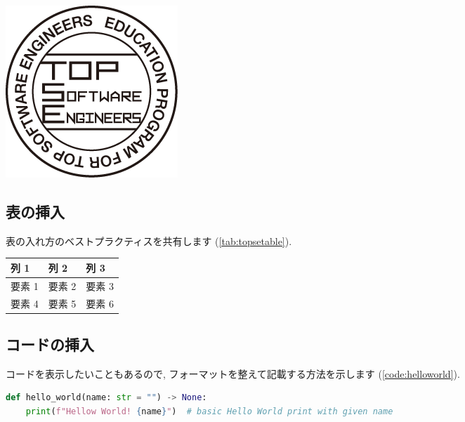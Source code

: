\documentclass[a4paper,9pt]{extarticle}
\begin{document}
\begin{multicols}{2}
\begin{center}
\begin{minipage}{\linewidth}
\centering
\includegraphics[width=0.5\linewidth]{image.png}
\label{fig:topselogo}
\end{minipage}
\end{center}

\subsection{表の挿入}
表の入れ方のベストプラクティスを共有します (\autoref{tab:topsetable}).
\begin{center}
\begin{minipage}{\linewidth}
\centering
{}
\noindent\begin{tabularx}{\linewidth}{|X|X|X|}  
\hline
\textbf{列 1} & \textbf{列 2} & \textbf{列 3} \\
\hline
要素 1 & 要素 2 & 要素 3 \\
\hline
要素 4 & 要素 5 & 要素 6 \\
\hline
\end{tabularx}
\label{tab:topsetable}
\end{minipage}
\end{center}

\subsection{コードの挿入}
コードを表示したいこともあるので, フォーマットを整えて記載する方法を示します (\autoref{code:helloworld}).

\begin{minipage}{0.95\linewidth}
\begin{lstlisting}[language=Python,caption={コードのキャプションはこちら.},label={code:helloworld}]
def hello_world(name: str = "") -> None:
    print(f"Hellow World! {name}")  # basic Hello World print with given name


\end{lstlisting}
\end{minipage}
\end{multicols}
\end{document}
